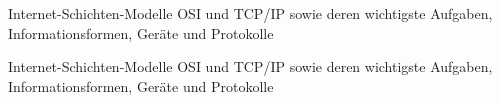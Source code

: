 

\thispagestyle{empty}
\begin{table}[H]
	\centering
	\footnotesize
	
	\caption{Internet-Schichten-Modelle \acrshort{OSI} und \acrshort{TCP}/\acrshort{IP} sowie deren wichtigste Aufgaben, Informationsformen, Geräte und Protokolle}
	\label{table:osi-layers}
\end{table}
\begin{table}[H]
	\centering
	\footnotesize
	
	\caption{Internet-Schichten-Modelle \acrshort{OSI} und \acrshort{TCP}/\acrshort{IP} sowie deren wichtigste Aufgaben, Informationsformen, Geräte und Protokolle}
\end{table}
